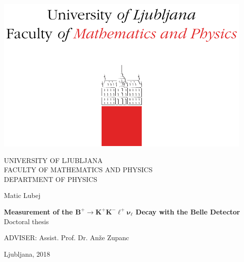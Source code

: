 \pagestyle{empty}
\begin{center}

\includegraphics[trim={0 0 0 2cm},clip]{fig/logo}

{\large UNIVERSITY OF LJUBLJANA\\
FACULTY OF MATHEMATICS AND PHYSICS\\
DEPARTMENT OF PHYSICS\\}

\vspace{5cm}

{\Large Matic Lubej\\}

\vspace{10mm}

{\bf \Large Measurement of the $\bm{B^+ \to K^+K^-\ell^+\nu_\ell}$ Decay with the Belle Detector\\}
\vspace{5mm}
{\large Doctoral thesis}\\

\vfill

{\large ADVISER: Assist. Prof. Dr. An\v ze Zupanc\\
}

\vspace{2cm}
{\large Ljubljana, 2018}

\end{center}



